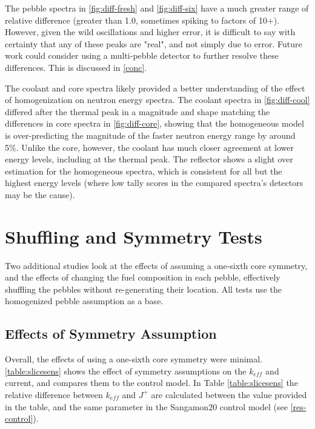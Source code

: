 The pebble spectra in \ref{fig:diff-fresh} and \ref{fig:diff-six} have a much greater range of relative difference (greater than 1.0, sometimes spiking to factors of 10+).  However, given the wild oscillations and higher error, it is difficult to say with certainty that any of these peaks are "real", and not simply due to error.  Future work could consider using a multi-pebble detector to further resolve these differences.  This is discussed in \autoref{conc}. 

The coolant and core spectra likely provided a better understanding of the effect of homogenization on neutron energy spectra. The coolant spectra in \ref{fig:diff-cool} differed after the thermal peak in a magnitude and shape matching the differences in core spectra in \ref{fig:diff-core}, showing that the homogeneous model is over-predicting the magnitude of the faster neutron energy range by around 5\%.  Unlike the core, however, the coolant has much closer agreement at lower energy levels, including at the thermal peak.  The reflector shows a slight over estimation for the homogeneous spectra, which is consistent for all but the highest energy levels (where low tally scores in the compared spectra's detectors may be the cause).



\section{Shuffling and Symmetry Tests}
Two additional studies look at the effects of assuming a one-sixth core symmetry, and the effects of changing the fuel composition in each pebble, effectively shuffling the pebbles without re-generating their location.  All tests use the homogenized pebble assumption as a base.

\subsection{Effects of Symmetry Assumption}
\label{res-sym}

Overall, the effects of using a one-sixth core symmetry were minimal.  \ref{table:slicesens} shows the effect of symmetry assumptions on the $k_{eff}$ and current, and compares them to the control model.  In Table \ref{table:slicesens} the relative difference between $k_{eff}$ and $J^+$ are calculated between the value provided in the table, and the same parameter in the Sangamon20 control model (see \autoref{res-control}).




